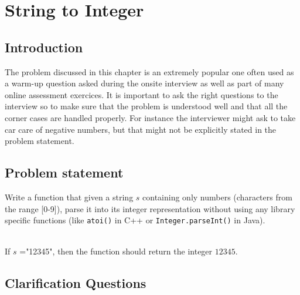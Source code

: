%

\chapter{String to Integer}
\label{ch:string_to_int}
\section*{Introduction}
The problem discussed in this chapter is an extremely popular one often used as a warm-up question asked during the onsite interview as well as part of many online assessment exercices. It is important to ask the right questions to the interview so to make sure that the problem is understood well and that all the corner cases are handled properly. For instance the interviewer might ask  to take car care of negative numbers, but that might not be explicitly stated in the problem statement.

\section{Problem statement}
\begin{exercise}
Write a function that given a string $s$ containing only numbers (characters from the range [0-9]), parse it into its integer representation without using any library specific functions (like \texttt{atoi()} in C++ or  \texttt{Integer.parseInt()} in Java).
\end{exercise}


\begin{example}
	\hfill \\
	If $s$ ="12345", then the function should return the integer $12345$.	
\end{example}


\section{Clarification Questions}

